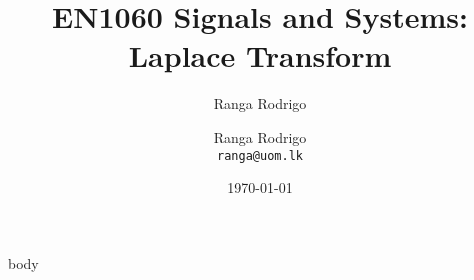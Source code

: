 \documentclass[t, aspectratio=169,xcolor={svgnames}, 10pt]{beamer}
\title{EN1060 Signals and Systems: Laplace Transform}
\author{Ranga Rodrigo}
\author[]{Ranga Rodrigo\\ \texttt{ranga@uom.lk}}
\institute[]{The University of Moratuwa, Sri Lanka}
\date{\today}
\begin{document}
    \begin{frame}
        \titlepage
    \end{frame}















    {body}



\end{document}
